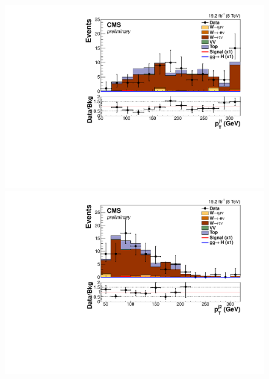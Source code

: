 \begin{figure}
  \includegraphics[width=.65\largefigwidth]{plots/parked/HIG-14-038-figs/output_sigreg/taunu_jet1_pt.pdf}
  \includegraphics[width=.65\largefigwidth]{plots/parked/HIG-14-038-figs/output_sigreg/taunu_jet2_pt.pdf}


\end{figure}
